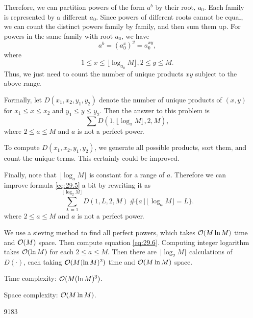 Therefore, we can partition powers of the form $a^b$ by their root, $a_0$. Each family is represented by a different $a_0$. Since powers of different roots cannot be equal, we can count the distinct powers family by family, and then sum them up. For powers in the same family with root $a_0$, we have
\[
a^b = (a_0^x)^y = a_0^{xy},
\]
where
\[
1 \le x \le \lfloor \log_{a_0} M \rfloor, 2 \le y \le M .
\]
Thus, we just need to count the number of unique products $xy$ subject to the above range. 

Formally, let $D(x_1, x_2, y_1, y_2)$ denote the number of unique products of $(x, y)$ for $x_1 \le x \le x_2$ and $y_1 \le y \le y_2$. Then the answer to this problem is
\begin{equation}
\sum D(1, \lfloor \log_a M \rfloor, 2, M) , \label{eq:29.5}
\end{equation}
where $2 \le a \le M$ and $a$ is not a perfect power.

To compute $D(x_1, x_2, y_1, y_2)$, we generate all possible products, sort them, and count the unique terms. This certainly could be improved.

Finally, note that $\lfloor \log_a M \rfloor$ is constant for a range of $a$. Therefore we can improve formula \eqref{eq:29.5} a bit by rewriting it as
\begin{equation}
\sum_{L=1}^{\lfloor \log_2 M \rfloor} D(1, L, 2, M) \, \# \big\{ a \,\big|\, \lfloor \log_{a} M \rfloor = L \big\} . \label{eq:29.6}
\end{equation}
where $2 \le a \le M$ and $a$ is not a perfect power.

\complexity

We use a sieving method to find all perfect powers, which takes $\mathcal{O}(M \ln M)$ time and $\mathcal{O}(M)$ space. Then compute equation \eqref{eq:29.6}. Computing integer logarithm takes $\mathcal{O}(\ln M)$ for each $2 \le a \le M$. Then there are $\lfloor \log_2 M \rfloor$ calculations of $D(\cdot)$, each taking $\mathcal{O}(M (\ln M)^2)$ time and $\mathcal{O}(M \ln M)$ space. 

Time complexity: $\mathcal{O}(M (\ln M)^3)$.

Space complexity: $\mathcal{O}(M \ln M)$.

\answer

9183


